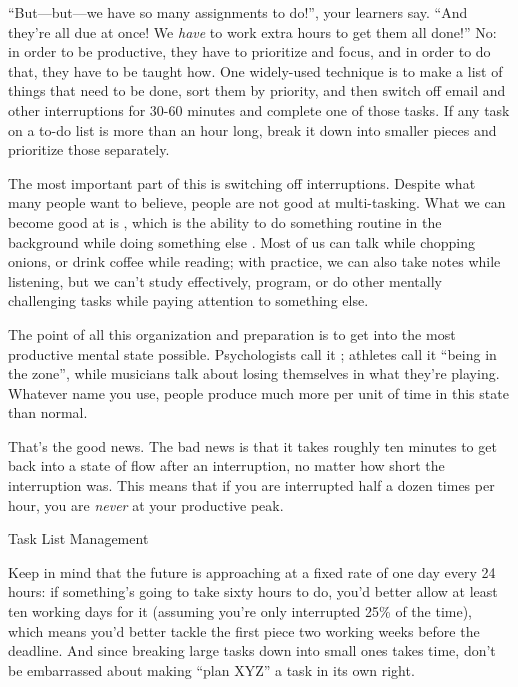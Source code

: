 ``But---but---we have so many assignments to do!'', your learners say.
``And they're all due at once!  We \emph{have} to work extra hours to
get them all done!''  No: in order to be productive, they have to
prioritize and focus, and in order to do that, they have to be taught
how.  One widely-used technique is to make a list of things that need
to be done, sort them by priority, and then switch off email and other
interruptions for 30-60 minutes and complete one of those tasks.  If
any task on a to-do list is more than an hour long, break it down into
smaller pieces and prioritize those separately.

The most important part of this is switching off interruptions.
Despite what many people want to believe, people are not good at
multi-tasking.  What we can become good at is
, which is the ability to do
something routine in the background while doing something else
\cite{Mill2016a}.  Most of us can talk while chopping onions, or drink
coffee while reading; with practice, we can also take notes while
listening, but we can't study effectively, program, or do other
mentally challenging tasks while paying attention to something else.

The point of all this organization and preparation is to get into the
most productive mental state possible.  Psychologists call it
 \cite{Csik2008}; athletes call it ``being in
the zone'', while musicians talk about losing themselves in what
they're playing.  Whatever name you use, people produce much more per
unit of time in this state than normal.

That's the good news.  The bad news is that it takes roughly ten
minutes to get back into a state of flow after an interruption, no
matter how short the interruption was.  This means that if you are
interrupted half a dozen times per hour, you are \emph{never} at your
productive peak.

\begin{callout}{Task List Management}

  Keep in mind that the future is approaching at a fixed rate of one
  day every 24 hours: if something's going to take sixty hours to do,
  you'd better allow at least ten working days for it (assuming you're
  only interrupted 25\% of the time), which means you'd better tackle
  the first piece two working weeks before the deadline.  And since
  breaking large tasks down into small ones takes time, don't be
  embarrassed about making ``plan XYZ'' a task in its own right.

\end{callout}

